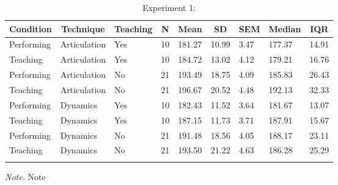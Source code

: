 \documentclass[
  man,floatsintext]{apa6}
\begin{document}
\begin{table}[tbp]

\begin{center}
\begin{threeparttable}

\caption{\label{tab:ioi-teaching-desc-1}Experiment 1:}

\begin{tabular}{lllllllll}
\toprule
Condition & \multicolumn{1}{c}{Technique} & \multicolumn{1}{c}{Teaching} & \multicolumn{1}{c}{N} & \multicolumn{1}{c}{Mean} & \multicolumn{1}{c}{SD} & \multicolumn{1}{c}{SEM} & \multicolumn{1}{c}{Median} & \multicolumn{1}{c}{IQR}\\
\midrule
Performing & Articulation & Yes & 10 & 181.27 & 10.99 & 3.47 & 177.37 & 14.91\\
Teaching & Articulation & Yes & 10 & 184.72 & 13.02 & 4.12 & 179.21 & 16.76\\
Performing & Articulation & No & 21 & 193.49 & 18.75 & 4.09 & 185.83 & 26.43\\
Teaching & Articulation & No & 21 & 196.67 & 20.52 & 4.48 & 192.13 & 32.33\\
Performing & Dynamics & Yes & 10 & 182.43 & 11.52 & 3.64 & 181.67 & 13.07\\
Teaching & Dynamics & Yes & 10 & 187.15 & 11.73 & 3.71 & 187.91 & 15.67\\
Performing & Dynamics & No & 21 & 191.48 & 18.56 & 4.05 & 188.17 & 23.11\\
Teaching & Dynamics & No & 21 & 193.50 & 21.22 & 4.63 & 186.28 & 25.29\\
\bottomrule
\addlinespace
\end{tabular}

\begin{tablenotes}[para]
\normalsize{\textit{Note.} Note}
\end{tablenotes}

\end{threeparttable}
\end{center}

\end{table}
\end{document}
